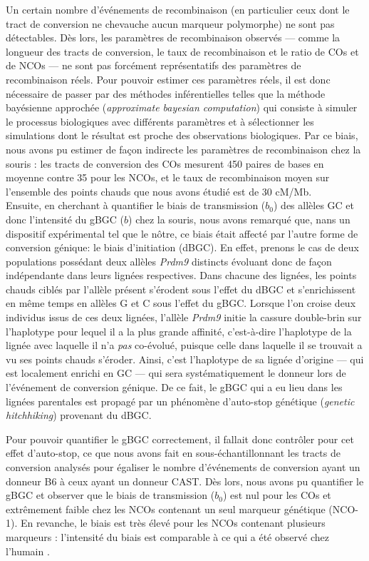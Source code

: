 {Un certain nombre d'événements de recombinaison (en particulier ceux dont le tract de conversion ne chevauche aucun marqueur polymorphe) ne sont pas détectables.
Dès lors, les paramètres de recombinaison observés — comme la longueur des tracts de conversion, le taux de recombinaison et le ratio de COs et de NCOs — ne sont pas forcément représentatifs des paramètres de recombinaison réels.
Pour pouvoir estimer ces paramètres réels, il est donc nécessaire de passer par des méthodes inférentielles telles que la méthode bayésienne approchée (\textit{approximate bayesian computation}) qui consiste à simuler le processus biologiques avec différents paramètres et à sélectionner les simulations dont le résultat est proche des observations biologiques.
Par ce biais, nous avons pu estimer de façon indirecte les paramètres de recombinaison chez la souris : les tracts de conversion des COs mesurent 450 paires de bases en moyenne contre 35 pour les NCOs, et le taux de recombinaison moyen sur l'ensemble des points chauds que nous avons étudié est de 30 cM/Mb.\\


Ensuite, en cherchant à quantifier le biais de transmission ($b_0$) des allèles GC et donc l'intensité du gBGC ($b$) chez la souris, nous avons remarqué que, nans un dispositif expérimental tel que le nôtre, ce biais était affecté par l'autre forme de conversion génique: le biais d'initiation (dBGC).
En effet, prenons le cas de deux populations possédant deux allèles \textit{Prdm9} distincts évoluant donc de façon indépendante dans leurs lignées respectives.
Dans chacune des lignées, les points chauds ciblés par l'allèle présent s'érodent sous l'effet du dBGC et s'enrichissent en même temps en allèles G et C sous l'effet du gBGC\@.
Lorsque l'on croise deux individus issus de ces deux lignées, l'allèle \textit{Prdm9} initie la cassure double-brin sur l'haplotype pour lequel il a la plus grande affinité, c'est-à-dire l'haplotype de la lignée avec laquelle il n'a \textit{pas} co-évolué, puisque celle dans laquelle il se trouvait a vu ses points chauds s'éroder.
Ainsi, c'est l'haplotype de sa lignée d'origine — qui est localement enrichi en GC — qui sera systématiquement le donneur lors de l'événement de conversion génique.
De ce fait, le gBGC qui a eu lieu dans les lignées parentales est propagé par un phénomène d’auto-stop génétique (\textit{genetic hitchhiking}) provenant du dBGC\@.

Pour pouvoir quantifier le gBGC correctement, il fallait donc contrôler pour cet effet d'auto-stop, ce que nous avons fait en sous-échantillonnant les tracts de conversion analysés pour égaliser le nombre d'événements de conversion ayant un donneur B6 à ceux ayant un donneur CAST\@.
Dès lors, nous avons pu quantifier le gBGC et observer que le biais de transmission ($b_0$) est nul pour les COs et extrêmement faible chez les NCOs contenant un seul marqueur génétique (NCO-1). 
En revanche, le biais est très élevé pour les NCOs contenant plusieurs marqueurs : l'intensité du biais est comparable à ce qui a été observé chez l'humain \citep{halldorsson2016rate}.\\

}
